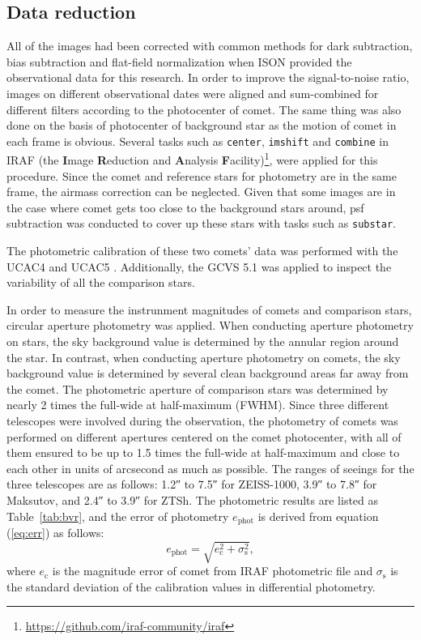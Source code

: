 \subsection{Data reduction}

All of the images had been corrected with common methods for dark subtraction, bias subtraction and flat-field normalization when ISON provided the observational data for this research. In order to improve the signal-to-noise ratio, images on different observational dates were aligned and sum-combined for different filters according to the photocenter of comet. The same thing was also done on the basis of photocenter of background star as the motion of comet in each frame is obvious. Several tasks such as \texttt{center}, \texttt{imshift} and \texttt{combine} in IRAF (the \textbf{I}mage \textbf{R}eduction and \textbf{A}nalysis \textbf{F}acility)\footnote{\url{https://github.com/iraf-community/iraf}}, were applied for this procedure. Since the comet and reference stars for photometry are in the same frame, the airmass correction can be neglected. Given that some images are in the case where comet gets too close to the background stars around, psf subtraction was conducted to cover up these stars with tasks such as \verb|substar|. 

The photometric calibration of these two comets' data was performed with the UCAC4 \citep{zacharias_fourth_2013} and UCAC5 \citep{zacharias_ucac5_2017}. Additionally, the GCVS 5.1 \citep{samus_general_2017} was applied to inspect the variability of all the comparison stars. 

In order to measure the  instrunment magnitudes of comets and comparison stars, circular aperture photometry was applied. When conducting aperture photometry on stars, the sky background value is determined by the annular region around the star. In contrast, when conducting aperture photometry on comets, the sky background value is determined by several clean background areas far away from the comet. The photometric aperture of comparison stars was determined by nearly \num{2} times the full-wide at half-maximum (FWHM). Since three different telescopes were involved during the observation, the photometry of comets was performed on different apertures centered on the comet photocenter, with all of them ensured to be up to \num{1.5} times the full-wide at half-maximum and close to each other in units of arcsecond as much as possible. 
The ranges of seeings for the three telescopes are as follows: \ang{;;1.2} to \ang{;;7.5} for ZEISS-1000, \ang{;;3.9} to \ang{;;7.8} for Maksutov, and \ang{;;2.4} to \ang{;;3.9} for ZTSh. 
The photometric results are listed as Table~\ref{tab:bvr}, and the error of photometry $e_{\mathrm{phot}}$ is derived from equation (\ref{eq:err}) as follows: 
\begin{equation}
    e_{\mathrm{phot}} = \sqrt{e_{\mathrm{c}}^{2} + \sigma_\mathrm{s}^2}, 
    \label{eq:err}
\end{equation}
where $e_\mathrm{c}$ is the magnitude error of comet from IRAF photometric file and $\sigma_\mathrm{s}$ is the standard deviation of the calibration values in differential photometry. 






